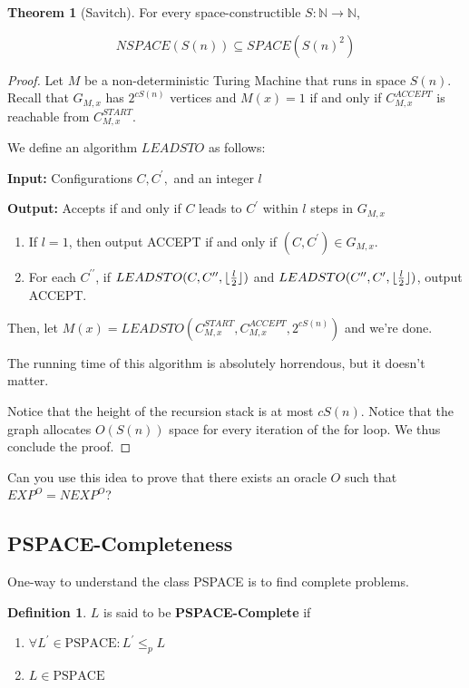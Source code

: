 \documentclass{article}
\DeclarePairedDelimiter\floor{\lfloor}{\rfloor}
\theoremstyle{definition}
\newtheorem{definition}{Definition}
\newtheorem{theorem}{Theorem}[section]
\begin{document}
\begin{theorem}[Savitch]
    For every space-constructible $S: \mathbb{N} \xrightarrow{} \mathbb{N}$, 

    \[ NSPACE (S(n)) \subseteq SPACE(S(n)^{2})\]
\end{theorem}
\begin{proof}
    Let $M$ be a non-deterministic Turing Machine that runs in space $S(n)$. Recall that $G_{M,x}$ has $2^{cS(n)}$ vertices and $M(x) = 1$ if and only if $C^{ACCEPT}_{M,x}$ is reachable from $C^{START}_{M,x}$. 

    We define an algorithm $LEADSTO$ as follows:

    \textbf{Input:} Configurations $C,C^{\prime},$ and an integer $l$
    
    \textbf{Output:} Accepts if and only if $C$ leads to $C^{\prime}$ within $l$ steps in $G_{M,x}$

    \begin{enumerate}
        \item If $l = 1$, then output ACCEPT if and only if $(C,C^{\prime}) \in G_{M,x}$.
        \item For each $C^{\prime\prime}$, if $LEADSTO(C, C^{\prime\prime}, \floor{\frac{l}{2}})$ and $LEADSTO(C^{\prime\prime}, C^{\prime}, \floor{\frac{l}{2}})$, output ACCEPT.
    \end{enumerate}

    Then, let $M(x) = LEADSTO(C^{START}_{M,x}, C^{ACCEPT}_{M,x}, 2^{cS(n)})$ and we're done. 

    The running time of this algorithm is absolutely horrendous, but it doesn't matter.

    Notice that the height of the recursion stack is at most $cS(n)$. Notice that the graph allocates $O(S(n))$ space for every iteration of the for loop. We thus conclude the proof.
\end{proof}


Can you use this idea to prove that there exists an oracle $O$ such that $EXP^{O} = NEXP^{O}$?

\subsection{PSPACE-Completeness}

One-way to understand the class PSPACE is to find complete problems. 

\begin{definition}
    $L$ is said to be \textbf{PSPACE-Complete} if

    \begin{enumerate}
        \item $\forall L^{\prime} \in \text{PSPACE}: L^{\prime} \leq_{p} L $
        \item $L \in \text{PSPACE}$
    \end{enumerate}
\end{definition}
\end{document}
